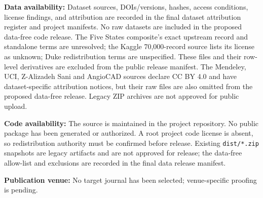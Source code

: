 \documentclass[journal]{IEEEtran}
\begin{document}
\textbf{Data availability:} Dataset sources, DOIs/versions, hashes, access
conditions, license findings, and attribution are recorded in the final
dataset attribution register and project manifests. No raw datasets are
included in the proposed data-free code release. The Five States composite's exact upstream record and standalone
terms are unresolved; the Kaggle 70,000-record source lists its license as
unknown; Duke redistribution terms are unspecified. These files and their
row-level derivatives are excluded from the public release manifest. The
Mendeley, UCI, Z-Alizadeh Sani and AngioCAD sources declare CC BY 4.0 and have
dataset-specific attribution notices, but their raw files are also omitted
from the proposed data-free release. Legacy ZIP archives are not approved for
public upload.

\textbf{Code availability:} The source is maintained in the project
repository. No public package has been generated or authorized. A root project
code license is absent, so redistribution authority must be confirmed before
release. Existing \texttt{dist/*.zip} snapshots are legacy artifacts and are
not approved for release; the data-free allow-list and exclusions are recorded
in the final data release manifest.

\textbf{Publication venue:} No target journal has been selected; venue-specific
proofing is pending.



\end{document}
